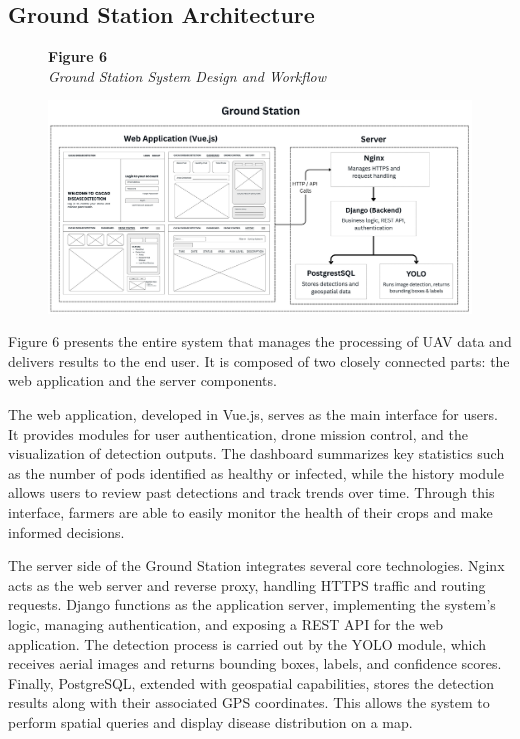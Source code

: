 \subsection{Ground Station Architecture}

\begin{figure}[H]
	\raggedright
	\textbf{Figure 6} \\ %
	\textit{Ground Station System Design and Workflow} %

	\vspace{0.5em}
	\centering
	\includegraphics[width=1\textwidth]{figures/Ground_Station.pdf} %

	\vspace{0.5em}
	\raggedright

	\label{fig:GroundStation}
\end{figure}

Figure 6 presents the entire system that manages the processing of UAV data and delivers results to the end user. It is composed of two closely connected parts: the web application and the server components.

The web application, developed in Vue.js, serves as the main interface for users. It provides modules for user authentication, drone mission control, and the visualization of detection outputs. The dashboard summarizes key statistics such as the number of pods identified as healthy or infected, while the history module allows users to review past detections and track trends over time. Through this interface, farmers are able to easily monitor the health of their crops and make informed decisions.

The server side of the Ground Station integrates several core technologies. Nginx acts as the web server and reverse proxy, handling HTTPS traffic and routing requests. Django functions as the application server, implementing the system’s logic, managing authentication, and exposing a REST API for the web application. The detection process is carried out by the YOLO module, which receives aerial images and returns bounding boxes, labels, and confidence scores. Finally, PostgreSQL, extended with geospatial capabilities, stores the detection results along with their associated GPS coordinates. This allows the system to perform spatial queries and display disease distribution on a map.

